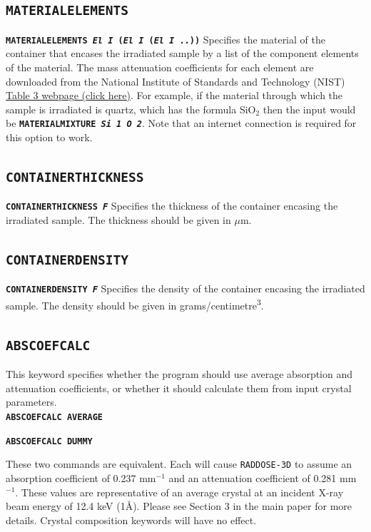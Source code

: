 \documentclass[a4paper]{article}
\newcommand{\RD}{\texttt{RADDOSE-3D}\xspace}
\newcommand{\Keyword}[1]{\texttt{\textbf{#1}}\xspace}
\newcommand{\SB}{\\[0.2em]}
\begin{document}
\subsection{\Keyword{MATERIALELEMENTS}}
\label{materialelements}
\noindent \Keyword{MATERIALELEMENTS \textit{El I} (\textit{El I} (\textit{El I} ..))}
Specifies the material of the container that encases the irradiated sample by a list of the component elements of the material. The mass attenuation coefficients for each element are downloaded from the National Institute of Standards and Technology (NIST) \href{http://physics.nist.gov/PhysRefData/XrayMassCoef/tab3.html}{Table 3 webpage (click here)}. For example, if the material through which the sample is irradiated is quartz, which has the formula SiO$_2$ then the input would be \Keyword{MATERIALMIXTURE \textit{Si 1 O 2}}. Note that an internet connection is required for this option to work.

\subsection{\Keyword{CONTAINERTHICKNESS}}

\noindent \Keyword{CONTAINERTHICKNESS \textit{F}}
Specifies the thickness of the container encasing the irradiated sample. The thickness should be given in $\mu$m.

\subsection{\Keyword{CONTAINERDENSITY}}

\noindent \Keyword{CONTAINERDENSITY \textit{F}}
Specifies the density of the container encasing the irradiated sample. The density should be given in grams/centimetre\textsuperscript{3}.


\newpage
\subsection{\Keyword{ABSCOEFCALC}}
\label{abscoefcalc}
This keyword specifies whether the program should use average absorption and attenuation coefficients, or whether it should calculate them from input crystal parameters.\SB

\noindent \Keyword{ABSCOEFCALC AVERAGE}

\noindent \Keyword{ABSCOEFCALC DUMMY}

These two commands are equivalent. Each will cause \RD to assume an absorption coefficient of 0.237 mm$^{-1}$ and an attenuation coefficient of 0.281 mm$^{-1}$. These values are representative of an average crystal at an incident X-ray beam energy of 12.4 keV (1\AA). Please see Section 3 in the main paper for more details. Crystal composition keywords will have no effect.\SB
\end{document}
